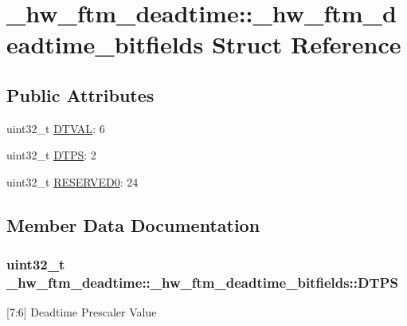 \hypertarget{struct__hw__ftm__deadtime_1_1__hw__ftm__deadtime__bitfields}{}\section{\+\_\+hw\+\_\+ftm\+\_\+deadtime\+:\+:\+\_\+hw\+\_\+ftm\+\_\+deadtime\+\_\+bitfields Struct Reference}
\label{struct__hw__ftm__deadtime_1_1__hw__ftm__deadtime__bitfields}
\subsection*{Public Attributes}
\begin{DoxyCompactItemize}
\item 
uint32\+\_\+t \hyperlink{struct__hw__ftm__deadtime_1_1__hw__ftm__deadtime__bitfields_a3aa0e5135bb033686013bb278ebae39a}{D\+T\+V\+AL}\+: 6
\item 
uint32\+\_\+t \hyperlink{struct__hw__ftm__deadtime_1_1__hw__ftm__deadtime__bitfields_a78f415aced8d91e2d47bdc32f228ca48}{D\+T\+PS}\+: 2
\item 
uint32\+\_\+t \hyperlink{struct__hw__ftm__deadtime_1_1__hw__ftm__deadtime__bitfields_a18b2f7740ef81a3ffeb9c78e04894519}{R\+E\+S\+E\+R\+V\+E\+D0}\+: 24
\end{DoxyCompactItemize}


\subsection{Member Data Documentation}
\subsubsection[{\texorpdfstring{D\+T\+PS}{DTPS}}]{\setlength{\rightskip}{0pt plus 5cm}uint32\+\_\+t \+\_\+hw\+\_\+ftm\+\_\+deadtime\+::\+\_\+hw\+\_\+ftm\+\_\+deadtime\+\_\+bitfields\+::\+D\+T\+PS}\hypertarget{struct__hw__ftm__deadtime_1_1__hw__ftm__deadtime__bitfields_a78f415aced8d91e2d47bdc32f228ca48}{}\label{struct__hw__ftm__deadtime_1_1__hw__ftm__deadtime__bitfields_a78f415aced8d91e2d47bdc32f228ca48}
\mbox{[}7\+:6\mbox{]} Deadtime Prescaler Value 
